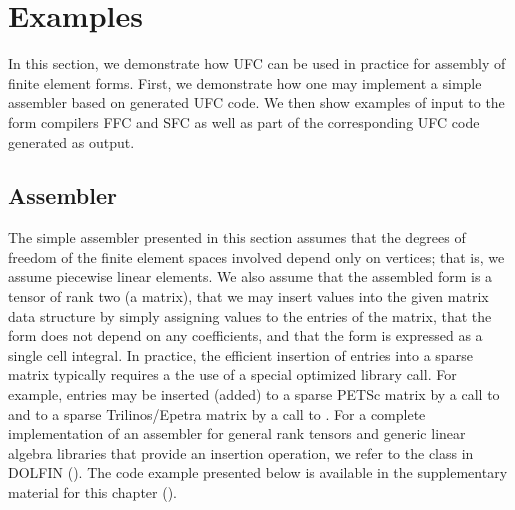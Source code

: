 \section{Examples}
\label{sec:alnes-2:examples}

In this section, we demonstrate how UFC can be used in practice for
assembly of finite element forms. First, we demonstrate how one may
implement a simple assembler based on generated UFC code. We then show
examples of input to the form compilers FFC and SFC as well as part of
the corresponding UFC code generated as output.

\subsection{Assembler}

The simple assembler presented in this section assumes that the
degrees of freedom of the finite element spaces involved depend only
on vertices; that is, we assume piecewise linear elements. We also
assume that the assembled form is a tensor of rank two (a matrix),
that we may insert values into the given matrix data structure by
simply assigning values to the entries of the matrix, that the form
does not depend on any coefficients, and that the form is expressed as
a single cell integral. In practice, the efficient insertion of
entries into a sparse matrix typically requires a the use of a special
optimized library call. For example, entries may be inserted (added)
to a sparse PETSc matrix by a call to  and to a
sparse Trilinos/Epetra matrix by a call to
. For a complete implementation of an
assembler for general rank tensors and generic linear algebra
libraries that provide an insertion operation, we refer to the class
 in DOLFIN (). The code example
presented below is available in the supplementary material for this
chapter ().

